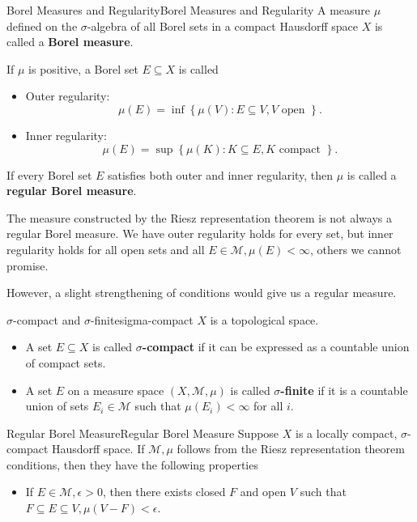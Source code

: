 \documentclass[../main.tex]{subfiles}
\begin{document}
\begin{definition}{Borel Measures and Regularity}{Borel Measures and Regularity}
	A measure $\mu$ defined on the $\sigma$-algebra of all Borel sets in a compact Hausdorff space $X$ is called a \textbf{Borel measure}.

	If $\mu$ is positive, a Borel set $E \subseteq X$ is called
	\begin{itemize}
	\item Outer regularity:
		\begin{equation*}
			\mu(E) = \inf \left\{ \mu(V): E \subseteq V, V \text{ open } \right\}.
		\end{equation*}
	\item Inner regularity:
		\begin{equation*}
			\mu(E) = \sup \left\{ \mu(K): K \subseteq E, K \text{ compact } \right\}.
		\end{equation*}
	\end{itemize}
	If every Borel set $E$ satisfies both outer and inner regularity, then $\mu$ is called a \textbf{regular Borel measure}.
\end{definition}

The measure constructed by the Riesz representation theorem is not always a regular Borel measure. We have outer regularity holds for every set, but inner regularity holds for all open sets and all $E\in \mathcal{M},\mu(E)<\infty $, others we cannot promise.

However, a slight strengthening of conditions would give us a regular measure.

\begin{definition}{$\sigma$-compact and $\sigma$-finite}{sigma-compact}
	$X$ is a topological space.

	\begin{itemize}
	\item A set $E \subseteq X$ is called \textbf{$\sigma$-compact} if it can be expressed as a countable union of compact sets.
	\item A set $E$ on a measure space $(X, \mathcal{M}, \mu)$ is called \textbf{$\sigma$-finite} if it is a countable union of sets $E_i \in \mathcal{M}$ such that $\mu(E_i) < \infty$ for all $i$.
	\end{itemize}
\end{definition}

\begin{theorem}{Regular Borel Measure}{Regular Borel Measure}
	Suppose $X$ is a locally compact, $\sigma$-compact Hausdorff space. If $\mathcal{M},\mu$ follows from the Riesz representation theorem conditions, then they have the following properties
	\begin{itemize}
	\item If $E\in \mathcal{M},\epsilon>0$, then there exists closed $F$ and open $V$ such that  $F \subseteq E \subseteq V, \mu(V-F)<\epsilon$.
	\end{itemize}
\end{theorem}
\end{document}
